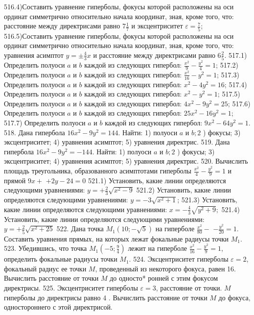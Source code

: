 516.4)Составить уравнение гиперболы, фокусы которой расположены на оси ординат симметрично относительно начала координат, зная, кроме того, что: расстояние между директрисами равно $7 \frac{1}{7}$ и эксцентриситет $\varepsilon=\frac{7}{5}$;
516.5)Составить уравнение гиперболы, фокусы которой расположены на оси ординат симметрично относительно начала координат, зная, кроме того, что: уравнения асимптот $y= \pm \frac{4}{3} x$ и расстояние между директрисами равно $6 \frac{2}{5}$.
517.1) Определить полуоси $a$ и $b$ каждой из следующих гипербол: $\frac{x^2}{9}-\frac{y^2}{4}=1$;
517.2) Определить полуоси $a$ и $b$ каждой из следующих гипербол: $\frac{x^2}{16}-y^2=1$;
517.3) Определить полуоси $a$ и $b$ каждой из следующих гипербол: $x^2-4 y^2=16$;
517.4) Определить полуоси $a$ и $b$ каждой из следующих гипербол: $x^2-y^2=1$;
517.5) Определить полуоси $a$ и $b$ каждой из следующих гипербол: $4 x^2-9 y^2=25$;
517.6) Определить полуоси $a$ и $b$ каждой из следующих гипербол: $25 x^2-16 y^2=1$;
517.7) Определить полуоси $a$ и $b$ каждой из следующих гипербол: $9 x^2-64 y^2=1$.
518. Дана гипербола $16 x^2-9 y^2=144$. Найти: 1) полуоси $a$ и $b ; 2$ ) фокусы; 3) эксцентриситет; 4) уравнения асимптот; 5) уравнения директрис.
519. Дана гипербола $16 x^2-9 y^2=-144$. Найти: 1) полуоси $a$ и $b ; 2$ ) фокусы; 3) эксцентриситет; 4) уравнения асимптот; 5) уравнения директрис.
520. Вычислить площадь треугольника, образованного асимптотами гиперболы $\frac{x^2}{4}-\frac{y^2}{9}=1$ и прямой $9 x+$ $+2 y-24=0$
521.1) Установить, какие линии определяются следующими уравнениями: $y=+\frac{2}{3} \sqrt{x^2-9}$
521.2) Установить, какие линии определяются следующими уравнениями: $y=-3 \sqrt{x^2+1}$;
521.3) Установить, какие линии определяются следующими уравнениями: $x=-\frac{4}{3} \sqrt{y^2+9} ;$
521.4) Установить, какие линии определяются следующими уравнениями: $y=+\frac{2}{5} \sqrt{x^2+25}$
522. Дана точка $M_1(10 ;-\sqrt{5})$ на гиперболе $\frac{x^2}{80}-$ $-\frac{y^2}{20}=1$. Составить уравнения прямых, на которых лежат фокальные радиусы точки $M_1$.
523. Убедившись, что точка $M_1\left(-5 ; \frac{9}{4}\right)$ лежит на гиперболе $\frac{x^2}{16}-\frac{y^2}{9}=1$, определить фокальные радиусы точки $M_1$.
524. Эксцентриситет гиперболы $\varepsilon=2$, фокальный радиус ее точки $M$, проведенный из некоторого фокуса, равен 16. Вычислить расстояние от точки $M$ до односто* ронней с этим фокусом директрисы.
525. Эксцентриситет гиперболы $\varepsilon=3$, расстояние от точки. $M$ гиперболы до директрисы равно 4 . Вычислить расстояние от точки $M$ до фокуса, одностороннего с этой директрисой.

